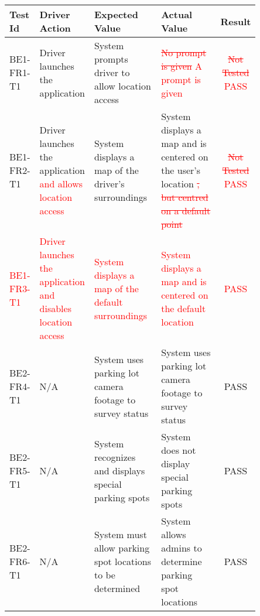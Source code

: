 \documentclass[12pt, titlepage]{article}
\begin{document}
\begin{center}
\begin{tabular}{|p{0.10\linewidth}|p{0.15\linewidth}|p{0.30\linewidth}|p{0.30\linewidth}|c|} 
\hline
\textbf{Test Id} & \textbf{Driver Action} & \textbf{Expected Value} &
\textbf{Actual Value} & \textbf{Result} \\
\hline
BE1-FR1-T1 & Driver launches the application & System prompts driver to allow
location access & \textcolor{red}{\st{No prompt is given} A prompt is given} &
\textcolor{red}{\st{Not Tested} PASS} \\
\hline
BE1-FR2-T1 & Driver launches the application \textcolor{red}{and allows location
access} & System displays a map of the driver's surroundings & System displays a
map and is centered on the user's location \textcolor{red}{\st{, but centred on
a default point}} & \textcolor{red}{\st{Not Tested} PASS} \\
\hline
\textcolor{red}{BE1-FR3-T1} & \textcolor{red}{Driver launches the application
and disables location access} & \textcolor{red}{System displays a map of the
default surroundings} & \textcolor{red}{System displays a map and is centered on
the default location}  & \textcolor{red}{PASS} \\ 
\hline
BE2-FR4-T1 & N/A & System uses parking lot camera footage to survey status &
System uses parking lot camera footage to survey status &
\textcolor{OliveGreen}{PASS} \\
\hline
BE2-FR5-T1 & N/A & System recognizes and displays special parking spots & System
does not display special parking spots & \textcolor{OliveGreen}{PASS} \\
\hline
BE2-FR6-T1 & N/A & System must allow parking spot locations to be determined &
System allows admins to determine parking spot locations &
\textcolor{OliveGreen}{PASS} \\
\hline
\end{tabular}
\end{center}
\end{document}
